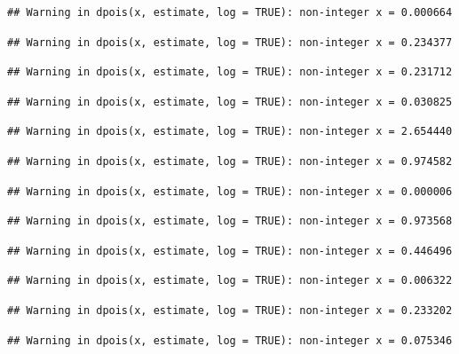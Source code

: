 \documentclass[]{article}
\begin{document}
\begin{verbatim}
## Warning in dpois(x, estimate, log = TRUE): non-integer x = 0.000664
\end{verbatim}

\begin{verbatim}
## Warning in dpois(x, estimate, log = TRUE): non-integer x = 0.234377
\end{verbatim}

\begin{verbatim}
## Warning in dpois(x, estimate, log = TRUE): non-integer x = 0.231712
\end{verbatim}

\begin{verbatim}
## Warning in dpois(x, estimate, log = TRUE): non-integer x = 0.030825
\end{verbatim}

\begin{verbatim}
## Warning in dpois(x, estimate, log = TRUE): non-integer x = 2.654440
\end{verbatim}

\begin{verbatim}
## Warning in dpois(x, estimate, log = TRUE): non-integer x = 0.974582
\end{verbatim}

\begin{verbatim}
## Warning in dpois(x, estimate, log = TRUE): non-integer x = 0.000006
\end{verbatim}

\begin{verbatim}
## Warning in dpois(x, estimate, log = TRUE): non-integer x = 0.973568
\end{verbatim}

\begin{verbatim}
## Warning in dpois(x, estimate, log = TRUE): non-integer x = 0.446496
\end{verbatim}

\begin{verbatim}
## Warning in dpois(x, estimate, log = TRUE): non-integer x = 0.006322
\end{verbatim}

\begin{verbatim}
## Warning in dpois(x, estimate, log = TRUE): non-integer x = 0.233202
\end{verbatim}

\begin{verbatim}
## Warning in dpois(x, estimate, log = TRUE): non-integer x = 0.075346
\end{verbatim}
\end{document}
